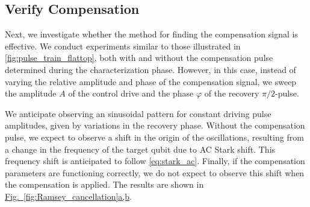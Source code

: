 \subsection{Verify Compensation}

Next, we investigate whether the method for finding the compensation signal is effective.
We conduct experiments similar to those illustrated in \cref{fig:pulse_train_flattop}, both with and without the compensation pulse determined during the characterization phase.
However, in this case, instead of varying the relative amplitude and phase of the compensation signal, we sweep the amplitude $A$ of the control drive and the phase $\varphi$ of the recovery $\pi / 2$-pulse.

We anticipate observing an sinusoidal pattern for constant driving pulse amplitudes, given by variations in the recovery phase.
Without the compensation pulse, we expect to observe a shift in the origin of the oscillations, resulting from a change in the frequency of the target qubit due to AC Stark shift.
This frequency shift is anticipated to follow \cref{eq:stark_ac}. 
Finally, if the compensation parameters are functioning correctly, we do not expect to observe this shift when the compensation is applied.
The results are shown in \hyperref[fig:Ramsey_cancellation]{Fig.~\ref{fig:Ramsey_cancellation}a,b}.

